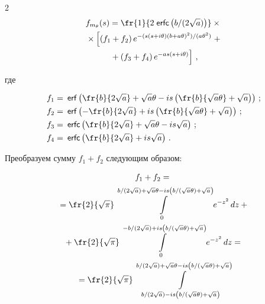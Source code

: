 \begin{multicols}{2}
\begin{multline*}
f_{m_{\theta}}(s) = \fr{1}{2\;{\sf erfc}\left(b/(2\sqrt{a})\right)}\times{}\\


{}\times


\left[\left(f_1 + f_2\right)e^{-({s(s + i\theta)(b + a\theta)^2})/({a\theta^2})}\;+ \right.\\


\left.{}+\left(f_3 + f_4\right)e^{-as(s+ i\theta)}\right]\,,


\end{multline*}


где


\begin{align*}


f_1 &= \erx{\fr{b}{{2\sqrt{a}}}+ \sqrt{a}\theta - is\left(\fr{b}{\sqrt{a}\theta} + \sqrt{a}\right)}\,;


\\


f_2 &= \erx{-\fr{b}{{2\sqrt{a}}} + is\left(\fr{b}{\sqrt{a}\theta} + \sqrt{a}\right)}\,;\\


f_3 &= \ercx{\fr{b}{2\sqrt{a}} + \sqrt{a}\theta - is\sqrt{a}}\,;\\


f_4 &= \ercx{\fr{b}{2\sqrt{a}} + is\sqrt{a}}\,.


\end{align*}


Преобразуем сумму $f_1 + f_2$ следующим образом:


\begin{multline*}


f_1 + f_2 ={}\\


{}= \fr{2}{\sqrt{\pi}} \int\limits_0^{{b}/({2\sqrt{a}}) + 


\sqrt{a}\theta - is\left({b}/({\sqrt{a}\theta}) + \sqrt{a}\right)} e^{-z^2}\,dz +{}\\


{}+


\fr{2}{\sqrt{\pi}}\int\limits_0^{-b/(2\sqrt{a}) + is\left({b}/({\sqrt{a}\theta}) + 


\sqrt{a}\right)} e^{-z^2}\,dz ={}\\


{}


= \fr{2}{\sqrt{\pi}} \int\limits_{{b}/({2\sqrt{a}}) - is\left({b}/({\sqrt{a}\theta}) + 


\sqrt{a}\right)}^{{b}/({2\sqrt{a}}) + \sqrt{a}\theta - is\left({b}/({\sqrt{a}\theta}) + \sqrt{a}\right)} 



\end{multline*}
\end{multicols}
